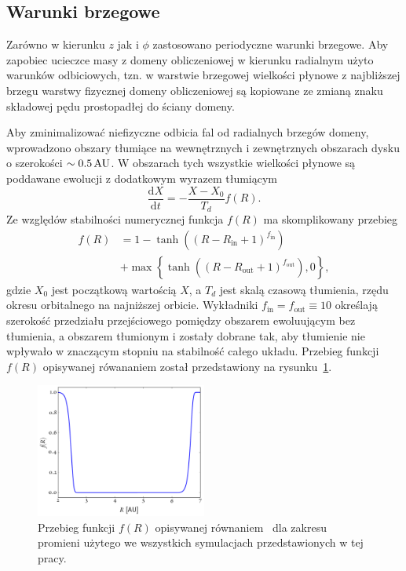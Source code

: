 \subsection{Warunki brzegowe}
Zarówno w kierunku $z$ jak i $\phi$ zastosowano periodyczne warunki brzegowe.
Aby zapobiec ucieczce masy z domeny obliczeniowej w kierunku radialnym użyto
warunków odbiciowych, tzn. w warstwie brzegowej wielkości płynowe z najbliższej
brzegu warstwy fizycznej domeny obliczeniowej są kopiowane ze zmianą znaku
składowej pędu prostopadłej do ściany domeny.

\par Aby zminimalizować niefizyczne odbicia fal od radialnych brzegów domeny,
wprowadzono obszary tłumiące na wewnętrznych i zewnętrznych obszarach dysku o
szerokości $\sim0.5\hbox{$\thinspace\textrm{AU}$}$. W obszarach tych wszystkie wielkości płynowe są
poddawane ewolucji z dodatkowym wyrazem tłumiącym
\begin{equation}
  \frac{\textrm{d}X}{\textrm{d}t} = - \frac{X-X_0}{T_d}f(R).
\end{equation}
Ze względów stabilności numerycznej funkcja $f(R)$ ma skomplikowany przebieg
\begin{equation}\label{eq:overlap}
   \begin{split} 
      f(R) &= 1 - \tanh\left(\left(R - R_\textrm{in} + 1
      \right)^{f_\textrm{in}}\right)\\ &+ \max\left\{ \tanh\left(\left(R -
      R_\textrm{out} + 1\right)^{f_\textrm{out}}\right), 0\right\}, 
   \end{split}
\end{equation}
gdzie $X_0$ jest początkową wartością $X$, a $T_d$ jest skalą czasową tłumienia,
rzędu okresu orbitalnego na najniższej orbicie.
Wykładniki $f_\textrm{in}=f_\textrm{out}\equiv10$ określają szerokość przedziału
przejściowego pomiędzy obszarem ewoluującym bez tłumienia, a obszarem tłumionym
i zostały dobrane tak, aby tłumienie nie wpływało w znaczącym stopniu na
stabilność całego układu. Przebieg funkcji $f(R)$ opisywanej rówananiem
 został przedstawiony na rysunku~\ref{fig:overlap}.
%
\begin{figure}
   \centering
   \includegraphics[width=0.5\textwidth]{figures/overlap}
   \caption{Przebieg funkcji $f(R)$ opisywanej równaniem~ dla
   zakresu promieni użytego we wszystkich symulacjach przedstawionych w tej
pracy.}
   \label{fig:overlap}
\end{figure}
%
